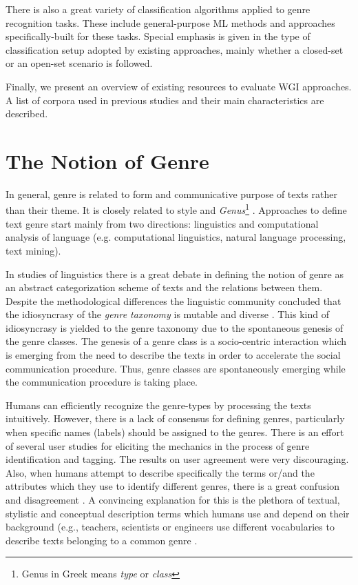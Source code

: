 There is also a great variety of classification algorithms applied to genre recognition tasks. These include general-purpose ML methods and approaches specifically-built for these tasks. Special emphasis is given in the type of classification setup adopted by existing approaches, mainly whether a closed-set or an open-set scenario is followed.

Finally, we present an overview of existing resources to evaluate WGI approaches. A list of corpora used in previous studies and their main characteristics are described. 

\section{The Notion of Genre}
\label{chap:relevant_work:sec:definitions}

In general, genre is related to form and communicative purpose of texts rather than their theme. It is closely related to style and \textit{Genus}\footnote{Genus in Greek means \textit{type} or \textit{class}} \parencite{sugiyanto2014term}. Approaches to define text genre start mainly from two directions: linguistics and computational analysis of language (e.g. computational linguistics, natural language processing, text mining). 

In studies of linguistics there is a great debate in defining the notion of genre as an abstract categorization scheme of texts and the relations between them. Despite the methodological differences the linguistic community concluded that the idiosyncrasy of the \textit{genre taxonomy} is mutable and diverse \parencite{coutinho2009describe}. This kind of idiosyncrasy is yielded to the genre taxonomy due to the spontaneous genesis of the genre classes. The genesis of a genre class is a socio-centric interaction which is emerging from the need to describe the texts in order to accelerate the social communication procedure. Thus, genre classes are spontaneously emerging while the communication procedure is taking place.

Humans can efficiently recognize the genre-types by processing the texts intuitively. However, there is a lack of consensus for defining genres, particularly when specific names (labels) should be assigned to the genres. There is an effort of several user studies for eliciting the mechanics in the process of genre identification and tagging. The results on user agreement were very discouraging. Also, when humans attempt to describe specifically the terms or/and the attributes which they use to identify different genres, there is a great confusion and disagreement \parencite{Rosso2005,Asheghi2015}. A convincing explanation for this is the plethora of textual, stylistic and conceptual description terms which humans use and depend on their background (e.g., teachers, scientists or engineers use different vocabularies to describe texts belonging to a common genre \parencite{roussinov2001genre, crowston2011problems}.

